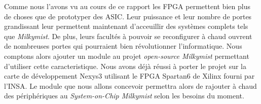 Comme nous l'avons vu au cours de ce rapport les FPGA permettent bien plus de choses que
de prototyper des ASIC. Leur puissance et leur nombre de portes grandissant
leur permettent maintenant d'acceuillir des systèmes complets tels que \textit{Milkymist}. De plus,
leurs facultés à pouvoir se reconfigurer à chaud ouvrent de nombreuses portes qui
pourraient bien révolutionner l'informatique. Nous comptons alors ajouter un module
au projet \textit{open-source Milkymist} permettant d'utiliser cette caracteristique. Nous
avons déjà réussi à porter le projet sur la carte de développement Nexys3 utilisant
le FPGA Spartan6 de Xilinx fourni par l'INSA. Le module que nous allons
concevoir permettra alors de rajouter à chaud des périphériques au \textit{System-on-Chip
Milkymist} selon les besoins du moment.

